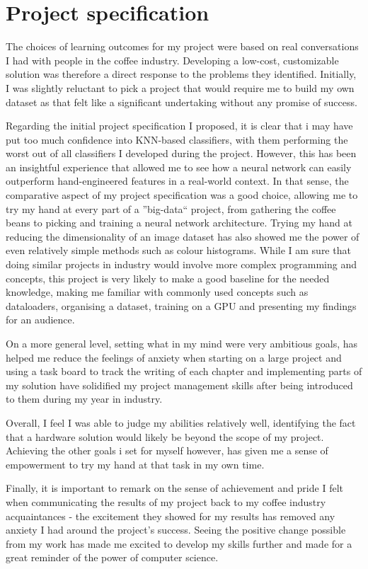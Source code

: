 \documentclass[12pt]{article}
\begin{document}
\thispagestyle{fancy}
\section{Project specification}
\label{sec:section-1}
The choices of learning outcomes for my project were based on real conversations I had with people in the coffee industry.
Developing a low-cost, customizable solution was therefore a direct response to the problems they identified.
Initially, I was slightly reluctant to pick a project that would require me to build my own dataset as that felt like a significant
undertaking without any promise of success.

Regarding the initial project specification I proposed, it is clear that i may have put too much confidence into KNN-based classifiers,
with them performing the worst out of all classifiers I developed during the project.
However, this has been an insightful experience that allowed me to see how a neural network can easily outperform hand-engineered features
in a real-world context.
In that sense, the comparative aspect of my project specification was a good choice, allowing me to try my hand at every part
of a ''big-data`` project, from gathering the coffee beans to picking and training a neural network architecture.
Trying my hand at reducing the dimensionality of an image dataset has also showed me the power of even relatively simple methods such as colour histograms.
While I am sure that doing similar projects in industry would involve more complex programming and concepts, this project is very likely
to make a good baseline for the needed knowledge, making me familiar with commonly used concepts such as dataloaders, organising a dataset,
training on a GPU and presenting my findings for an audience.

On a more general level, setting what in my mind were very ambitious goals, has helped me reduce the feelings of anxiety when starting on a large project
and using a task board to track the writing of each chapter and implementing parts of my solution have solidified my project management skills after being introduced to them
during my year in industry.

Overall, I feel I was able to judge my abilities relatively well, identifying the fact that a hardware solution would likely be beyond
the scope of my project.
Achieving the other goals i set for myself however, has given me a sense of empowerment to try my hand at that task in my own time.

Finally, it is important to remark on the sense of achievement and pride I felt when communicating the results of my project back to my
coffee industry acquaintances - the excitement they showed for my results has removed any anxiety I had around the project's success.
Seeing the positive change possible from my work has made me excited to develop my skills further and made for a great reminder of the power of computer science.
\end{document}
